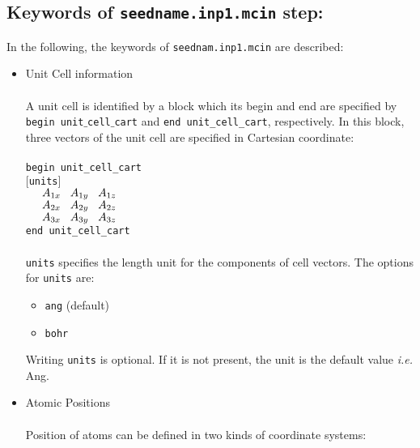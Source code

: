 \documentclass[10pt]{report}
\def\la{\large}
\begin{document}
\subsection{Keywords of {\tt seedname.inp1.mcin} step:}
In the following, the keywords of {\tt seednam.inp1.mcin} are described:
\begin{itemize} %
\item {\la Unit Cell information}\\\\
A unit cell is identified by a block which its begin and end are specified by {\tt begin unit$\_$cell$\_$cart} 
and {\tt end unit\_cell\_cart}, respectively. In this block, three vectors of the unit cell are specified in Cartesian coordinate:\\\\
{\tt begin unit\_cell\_cart} \\
     \hspace*{0.5cm}$[${\tt units}$]$\\
    $\hspace*{0.5cm}A_{1x}\hspace{0.3cm} A_{1y}\hspace{0.3cm} A_{1z}$ \\
    $\hspace*{0.5cm}A_{2x}\hspace{0.3cm} A_{2y}\hspace{0.3cm} A_{2z}$ \\
    $\hspace*{0.5cm}A_{3x}\hspace{0.3cm} A_{3y}\hspace{0.3cm} A_{3z}$ \\
{\tt end unit\_cell\_cart} \\
\\  {\tt units} specifies the length unit for the components of cell vectors. The options for {\tt units} are:
\begin{itemize} [label=\adfhalfrightarrowhead]
\item  {\tt ang}  (default)
\item  {\tt bohr}
\end{itemize}
Writing {\tt units} is optional. If it is not present, the unit is the default value {\it i.e.} Ang.
\item {\la Atomic Positions}\\\\         
Position of atoms can be defined in two kinds of coordinate systems:
\begin{center}

\end{center}
\end{itemize}
\end{document}
